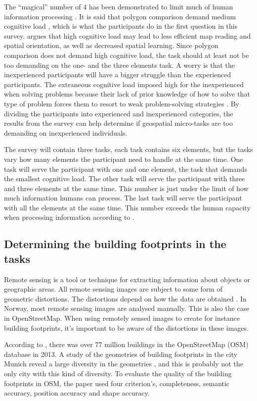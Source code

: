 The “magical” number of 4 has been demonstrated to limit much of human information processing \citep{Mandler2013}. It is said that polygon comparison demand medium cognitive load \citep{Kiefer2016}, which is what the participants do in the first question in this survey. \cite{Kiefer2016} argues that high cognitive load may lead to less efficient map reading and spatial orientation, as well as decreased spatial learning. Since polygon comparison does not demand high cognitive load, the task should at least not be too demanding on the one- and the three elements task. A worry is that the inexperienced participants will have a bigger struggle than the experienced participants. The extraneous cognitive load imposed high for the inexperienced when solving problems because their lack of prior knowledge of how to solve that type of problem forces them to resort to weak problem-solving strategies \citep{Leppink2014a}. By dividing the participants into experienced and inexperienced categories, the results from the survey can help determine if geospatial micro-tasks are too demanding on inexperienced individuals. 

The survey will contain three tasks, each task contains six elements, but the tasks vary how many elements the participant need to handle at the same time. One task will serve the participant with one and one element, the task that demands the smallest cognitive load. The other task will serve the participant with three and three elements at the same time. This number is just under the limit of how much information humans can process. The last task will serve the participant with all the elements at the same time. This number exceeds the human capacity when processing information according to \cite{Leppink2014a}. 

\subsection[Building shapes]{Determining the building footprints in the tasks}
Remote sensing is a tool or technique for extracting information about objects or geographic areas. All remote sensing images are subject to some form of geometric distortions. The distortions depend on how the data are obtained \citep{Toutin2004}.  In Norway, most remote sensing images are analysed manually. This is also the case in OpenStreetMap. When using remotely sensed images to create for instance building footprints, it's important to be aware of the distortions in these images. 

According to \cite{Fan2014}, there was over 77 million buildings in the OpenStreetMap (OSM) database in 2013. A study of the geometries of building footprints in the city Munich reveal a large diversity in the geometries \citep{Fan2014}, and this is probably not the only city with this kind of diversity. To evaluate the quality of the building footprints in OSM, the \cite{Fan2014} paper used four criterion's, completeness, semantic accuracy, position accuracy and shape accuracy. 


